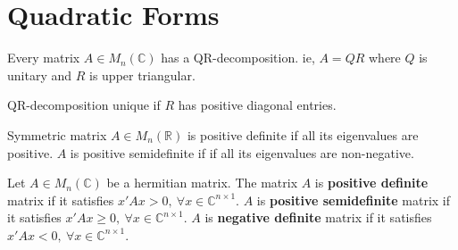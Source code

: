 \section{Quadratic Forms}
\begin{theorem}[QR decomposition]
	Every matrix $A \in M_n(\mathbb{C})$ has a QR-decomposition. ie, $A = QR$ where $Q$ is unitary and $R$ is upper triangular.
\end{theorem}
\begin{note}
	QR-decomposition unique if $R$ has positive diagonal entries.
\end{note}

\begin{definition}[definite]
	Symmetric matrix $A \in M_n(\mathbb{R})$ is positive definite if all its eigenvalues are positive.
	$A$ is positive semidefinite if if all its eigenvalues are non-negative.
\end{definition}

\begin{definition}[definite]
	Let $A \in M_n(\mathbb{C})$ be a hermitian matrix.
	The matrix $A$ is \textbf{positive definite} matrix if it satisfies $x'Ax > 0,\ \forall x \in \mathbb{C}^{n \times 1}$.
	$A$ is \textbf{positive semidefinite} matrix if it satisfies $x'Ax \ge  0,\ \forall x \in \mathbb{C}^{n \times 1}$.
	$A$ is \textbf{negative definite} matrix if it satisfies $x'Ax < 0,\ \forall x \in \mathbb{C}^{n \times 1}$.
\end{definition}
